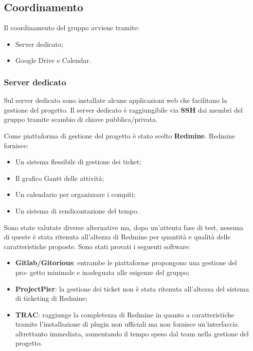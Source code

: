 \documentclass[a4paper,12pt]{article}
\newcounter{subsubsubsection}[subsubsection]
\begin{document}
\subsection{Coordinamento}
{
Il coordinamento del gruppo avviene tramite:
\begin{itemize}
\item Server dedicato;
\item Google Drive  e Calendar. 
\end{itemize} 


\subsubsection{Server dedicato} 
{
Sul server dedicato sono installate alcune applicazioni web che facilitano la gestione del 
progetto. 
Il server dedicato è raggiungibile via \textbf{SSH}  dai membri del gruppo tramite scambio di 
chiave pubblica/privata. 


{ \label{sec:Redmine}
	Come piattaforma di gestione del progetto è stato scelto \textbf{Redmine}. Redmine fornisce:
	\begin{itemize}
	
	 
	\item Un sistema flessibile di gestione dei ticket; 
	\item Il grafico Gantt  delle attività; 
	\item Un calendario per organizzare i compiti; 
	\item Un sistema di rendicontazione del tempo. 
	\end{itemize}
	Sono state valutate diverse alternative ma, dopo un’attenta fase di test, nessuna di 
	queste è stata ritenuta all’altezza di Redmine per quantità e qualità delle caratteristiche 
	proposte. 
	Sono stati provati i seguenti software:
	\begin{itemize}
	 \item \textbf{Gitlab/Gitorious}: entrambe le piattaforme propongono una gestione del pro- 
		getto minimale e inadeguata alle esigenze del gruppo; 
     \item \textbf{ProjectPier}: la gestione dei ticket non è stata ritenuta all’altezza del sistema di 
		ticketing di Redmine; 
     \item  \textbf{TRAC}: raggiunge la completezza di Redmine in quanto a caratteristiche tramite 
		l’installazione di plugin non ufficiali ma non fornisce un’interfaccia altrettanto 
		immediata, aumentando il tempo speso dal team nella gestione del progetto. 
	

\end{itemize}}}}
\end{document}
